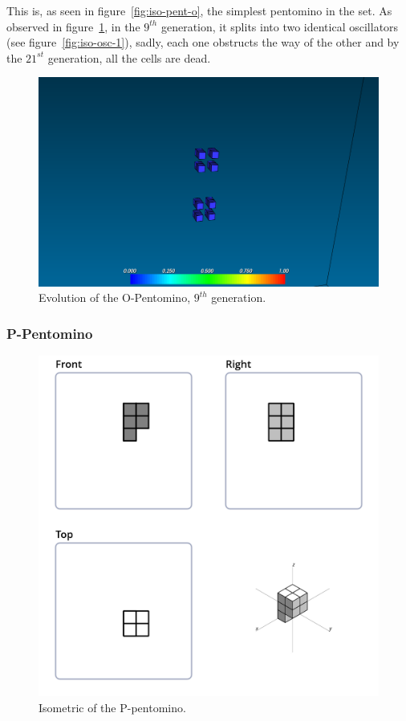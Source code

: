 This is, as seen in figure~\ref{fig:iso-pent-o}, the simplest pentomino in the
set. As observed in figure~\ref{fig:ss-pent:o-osc}, in the $9^{th}$ generation,
it splits into two identical oscillators (see figure~\ref{fig:iso-osc-1}),
sadly, each one obstructs the way of the other and by the $21^{st}$ generation,
all the cells are dead.

\begin{figure}[H]
	\centering
	\includegraphics[scale=0.3]{pentominoes_ss/o_osc.png}
	\caption{Evolution of the O-Pentomino, $9^{th}$ generation.}
  \label{fig:ss-pent:o-osc}
\end{figure}

\subsubsection{P-Pentomino}
\label{sec:p-pentomino}

\begin{figure}[H]
	\centering
	\includegraphics[scale=0.3]{iso_diagrams/p.png}
	\caption{Isometric of the P-pentomino.}
	\label{fig:iso-pent-p}
\end{figure}

